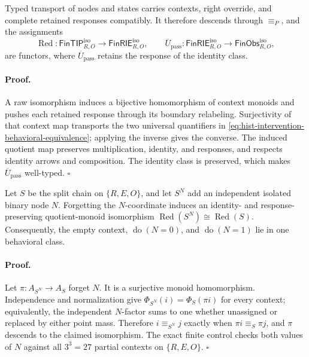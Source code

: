 Typed transport of nodes and states carries contexts, right override, and
complete retained responses compatibly.  It therefore descends through
\(\equiv_P\), and the assignments
\begin{equation}
\operatorname{Red}:\mathsf{FinTIP}_{R,O}^{\mathrm{iso}}
\longrightarrow\mathsf{FinRIE}_{R,O}^{\mathrm{iso}},
\qquad
\overline U_{\mathrm{pass}}:\mathsf{FinRIE}_{R,O}^{\mathrm{iso}}
\longrightarrow\mathsf{FinObs}_{R,O}^{\mathrm{iso}},
\label{eq:hist-intervention-reduced-functors}
\end{equation}
are functors, where \(\overline U_{\mathrm{pass}}\) retains the response of
the identity class.  

\paragraph{Proof.}
A raw isomorphism induces a bijective homomorphism of context monoids and
pushes each retained response through its boundary relabeling.  Surjectivity
of that context map transports the two universal quantifiers in
\eqref{eq:hist-intervention-behavioral-equivalence}; applying the inverse
gives the converse.  The induced quotient map preserves multiplication,
identity, and responses, and respects identity arrows and composition.  The
identity class is preserved, which makes \(\overline U_{\mathrm{pass}}\)
well-typed.  \(\square\)

Let \(S\) be the split chain on \(\{R,E,O\}\), and let \(S^N\) add an
independent isolated binary node \(N\).  Forgetting the \(N\)-coordinate
induces an identity- and response-preserving quotient-monoid isomorphism
\(\operatorname{Red}(S^N)\cong\operatorname{Red}(S)\).  Consequently,
the empty context, \(\operatorname{do}(N=0)\), and
\(\operatorname{do}(N=1)\) lie in one behavioral class.  

\paragraph{Proof.}
Let \(\pi:A_{S^N}\to A_S\) forget \(N\).  It is a surjective monoid
homomorphism.  Independence and normalization give
\(\Phi_{S^N}(i)=\Phi_S(\pi i)\) for every context; equivalently, the
independent \(N\)-factor sums to one whether unassigned or replaced by
either point mass.  Therefore
\(i\equiv_{S^N}j\) exactly when \(\pi i\equiv_S\pi j\), and \(\pi\)
descends to the claimed isomorphism.  The exact finite control checks both
values of \(N\) against all \(3^3=27\) partial contexts on
\(\{R,E,O\}\).  \(\square\)

